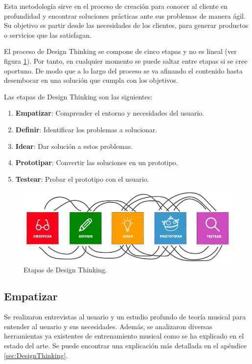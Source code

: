 \documentclass[12pt,twoside,titlepage]{report}
\begin{document}
Esta metodología sirve en el proceso de creación para conocer al cliente en profundidad y encontrar soluciones prácticas ante sus problemas de manera ágil. Su objetivo es partir desde las necesidades de los clientes, para generar productos o servicios que las satisfagan.

El proceso de Design Thinking se compone de cinco etapas y no es lineal (ver figura \ref{fig:DesignThinking}). Por tanto, en cualquier momento se puede saltar entre etapas si se cree oportuno. De modo que a lo largo del proceso se va afinando el contenido hasta desembocar en una solución que cumpla con los objetivos. 

Las etapas de Design Thinking son las siguientes:
\begin{enumerate}
    \item \textbf{Empatizar}: Comprender el entorno y necesidades del usuario. 
    \item \textbf{Definir}: Identificar los problemas a solucionar. 
    \item \textbf{Idear}: Dar solución a estos problemas. 
    \item \textbf{Prototipar}: Convertir las soluciones en un prototipo. 
    \item \textbf{Testear}: Probar el prototipo con el usuario.
\end{enumerate}

\begin{figure}[H] 
    \includegraphics[scale=0.44]{Design Thinking/Etapas}
    \centering
    \caption{Etapas de Design Thinking.}
    \label{fig:DesignThinking}
\end{figure}

\subsection{Empatizar}

Se realizaron entrevistas al usuario y un estudio profundo de teoría musical para entender al usuario y sus necesidades. Además, se analizaron diversas herramientas ya existentes de entrenamiento musical como se ha explicado en el estado del arte. Se puede encontrar una explicación más detallada en el apéndice \ref{sec:DesignThinking}.
\end{document}
